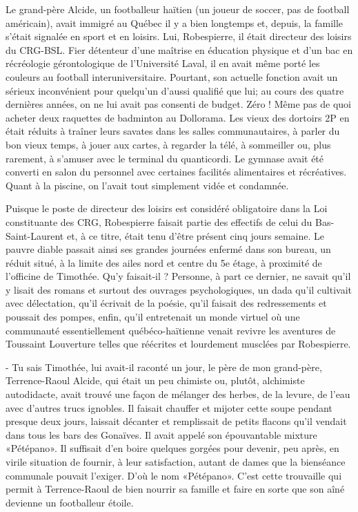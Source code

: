 Le grand-père Alcide, un footballeur haïtien (un joueur de soccer, pas de football américain), avait immigré au Québec il y a bien longtemps et, depuis, la famille s’était signalée en sport et en loisirs. Lui, Robespierre, il était directeur des loisirs du CRG-BSL. Fier détenteur d’une maîtrise en éducation physique et d’un bac en récréologie gérontologique de l’Université Laval, il en avait même porté les couleurs au football interuniversitaire. Pourtant, son actuelle fonction avait un sérieux inconvénient pour quelqu’un d’aussi qualifié que lui; au cours des quatre dernières années, on ne lui avait pas consenti de budget. Zéro ! Même pas de quoi acheter deux raquettes de badminton au Dollorama. Les vieux des dortoirs 2P en était réduits à traîner leurs savates dans les salles communautaires, à parler du bon vieux temps, à jouer aux cartes, à regarder la télé, à sommeiller ou, plus rarement, à s’amuser avec le terminal du quanticordi. Le gymnase avait été converti en salon du personnel avec certaines facilités alimentaires et récréatives. Quant à la piscine, on l’avait tout simplement vidée et condamnée.

Puisque le poste de directeur des loisirs est considéré obligatoire dans la Loi constituante des CRG, Robespierre faisait partie des effectifs de celui du Bas-Saint-Laurent et, à ce titre, était tenu d’être présent cinq jours semaine. Le pauvre diable passait ainsi ses grandes journées enfermé dans son bureau, un réduit situé, à la limite des ailes nord et centre du 5e étage, à proximité de l’officine de Timothée. Qu’y faisait-il ? Personne, à part ce dernier, ne savait qu’il y lisait des romans et surtout des ouvrages psychologiques, un dada qu’il cultivait avec délectation, qu’il écrivait de la poésie, qu’il faisait des redressements et poussait des pompes, enfin, qu’il entretenait un monde virtuel où une communauté essentiellement québéco-haïtienne venait revivre les aventures de Toussaint Louverture telles que réécrites et lourdement musclées par Robespierre.

- Tu sais Timothée, lui avait-il raconté un jour, le père de mon grand-père, Terrence-Raoul Alcide, qui était un peu chimiste ou, plutôt, alchimiste autodidacte, avait trouvé une façon de mélanger des herbes, de la levure, de l’eau avec d’autres trucs ignobles. Il faisait chauffer et mijoter cette soupe pendant presque deux jours, laissait décanter et remplissait de petits flacons qu’il vendait dans tous les bars des Gonaïves. Il avait appelé son épouvantable mixture «Pétépano». Il suffisait d’en boire quelques gorgées pour devenir, peu après, en virile situation de fournir, à leur satisfaction, autant de dames que la bienséance communale pouvait l’exiger. D’où le nom «Pétépano». C’est cette trouvaille qui permit à Terrence-Raoul de bien nourrir sa famille et faire en sorte que son aîné devienne un footballeur étoile.

